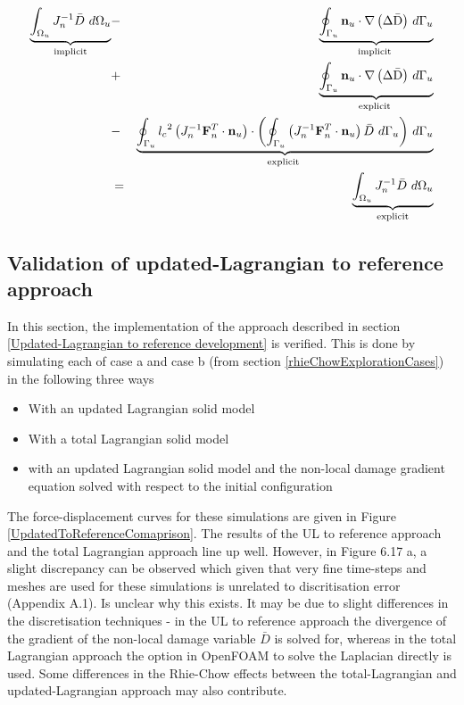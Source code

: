 \documentclass[sn-mathphys,Numbered,draft]{sn-jnl}%
\begin{document}
\begin{appendices}
\begin{eqnarray}
\label{eqn:fullUpdatedRefNonLocalToBESolved}
\underbrace{\int_{\mathrm{\Omega}_u} J^{-1}_n\bar{D}\ d\mathrm{\Omega}_u}_{\text {implicit}} &-& \underbrace{\oint_{\mathrm{\Gamma}_u}{\mathbf{n}_u\cdot\mathrm{\nabla}\left(\mathrm{\Delta \bar{D}}\right)}\ d\mathrm{\Gamma}_u}_{\text {implicit }} \notag \\
    &+&\underbrace{\oint_{\mathrm{\Gamma}_u}{\mathbf{n}_u\cdot\mathrm{\nabla}\left(\mathrm{\Delta \bar{D}}\right)}\ d\mathrm{\Gamma}_u}_{\text {explicit }} \notag \\
    &-&\underbrace{\oint_{\Gamma_u}{{l_c}^2 \left(J^{-1}_n\mathbf{F}_n^{T}\cdot \mathbf{n}_u\right)\cdot\left(\oint_{\Gamma_u}\left(J^{-1}_n\mathbf{F}_n^{T}\cdot \mathbf{n}_u\right)\bar{D}\ d\Gamma_u\right)}\ d\Gamma_u}_{\text {explicit }} \notag \\
    &=& \underbrace{\int_{\mathrm{\Omega}_u} J^{-1}_n\bar{D}\ d\mathrm{\Omega}_u}_{\text {explicit}}
\end{eqnarray}

\subsection{Validation of updated-Lagrangian to reference approach}

In this section, the implementation of the approach described in section \ref{Updated-Lagrangian to reference development} is verified. This is done by simulating each of case a and case b (from section \ref{rhieChowExplorationCases}) in the following three ways 
\begin{itemize}
    \item With an updated Lagrangian solid model
    \item With a total Lagrangian solid model
    \item with an updated Lagrangian solid model and the non-local damage gradient equation solved with respect to the initial configuration 
\end{itemize}

The force-displacement curves for these simulations are given in Figure \ref{UpdatedToReferenceComaprison}. The results of the UL to reference approach and the total Lagrangian approach line up well. However, in Figure 6.17 a, a slight discrepancy can be observed which given that very fine time-steps and meshes are used for these simulations is unrelated to discritisation error (Appendix A.1). Is unclear why this exists. It may be due to slight differences in the discretisation techniques - in the UL to reference approach the divergence of the gradient of the non-local damage variable $\bar{D}$ is solved for, whereas in the total Lagrangian approach the option in OpenFOAM to solve the Laplacian directly is used. Some differences in the Rhie-Chow effects between the total-Lagrangian and updated-Lagrangian approach may also contribute.


\end{appendices}
\end{document}
